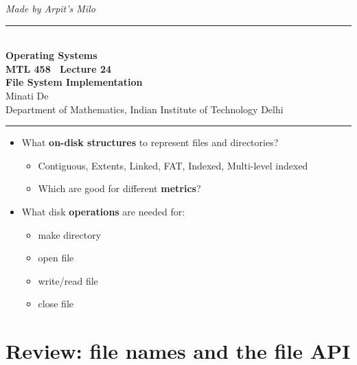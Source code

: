 \documentclass[11pt,a4paper]{article}
\begin{document}
\begin{center}
{\small\itshape Made by Arpit's Milo}\\[0.3em]
{\color{rulegray}\rule{\textwidth}{1.1pt}}\\[0.45em]
{\LARGE\bfseries Operating Systems}\\[0.25em]
{\Large\bfseries MTL 458 \textperiodcentered\ Lecture 24}\\[0.35em]
{\LARGE\bfseries File System Implementation}\\[0.35em]
{\large Minati De}\\[0.15em]
{\normalsize Department of Mathematics, Indian Institute of Technology Delhi}\\[0.35em]
{\color{rulegray}\rule{\textwidth}{1.1pt}}
\end{center}

\vspace{0.4em}
\begin{keybox}
\begin{itemize}
  \item What \textbf{on-disk structures} to represent files and directories?
  \begin{itemize}
    \item Contiguous, Extents, Linked, FAT, Indexed, Multi-level indexed
    \item Which are good for different \textbf{metrics}?
  \end{itemize}
  \item What disk \textbf{operations} are needed for:
  \begin{itemize}
    \item make directory
    \item open file
    \item write/read file
    \item close file
  \end{itemize}
\end{itemize}
\end{keybox}

\tableofcontents
\vspace{0.6em}
\noindent{\color{rulegray}\rule{\textwidth}{0.4pt}}

\section{Review: file names and the file API}
\end{document}
